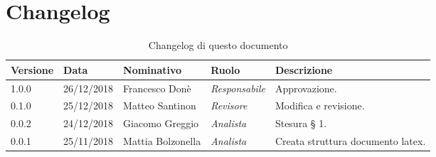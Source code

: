 \section*{Changelog}
\begin{table}[tbph]
        \centering
        \begin{tabularx}{\textwidth}{|l|l|l|l|X|}
                \hline
                \textbf{Versione} & \textbf{Data} & \textbf{Nominativo}  & \textbf{Ruolo} & 
                \textbf{Descrizione}\\
                \hline 
                
                \hline
                1.0.0 & 26/12/2018 & Francesco Donè & \textit{Responsabile}
                & Approvazione.\\
                
                \hline
                0.1.0 & 25/12/2018 & Matteo Santinon & \textit{Revisore}
                & Modifica e revisione.\\
                
                \hline
                0.0.2 & 24/12/2018 &  Giacomo Greggio & \textit{Analista}
                & Stesura § 1.\\

                \hline
                0.0.1 & 25/11/2018 & Mattia Bolzonella & \textit{Analista}
                & Creata struttura documento latex.\\
                
                \hline
                
        \end{tabularx}
        \caption{Changelog di questo documento}
\end{table}